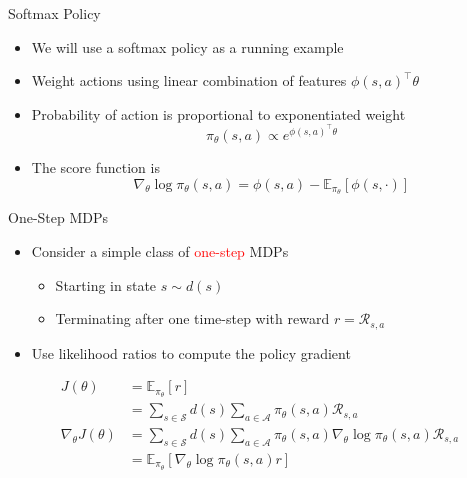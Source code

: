 \begin{frame}{Softmax Policy}
\begin{itemize}
  \item We will use a softmax policy as a running example
  \item Weight actions using linear combination of features $\phi(s, a)^\top \theta$
  \item Probability of action is proportional to exponentiated weight
  \[ \pi_\theta(s, a) \propto e^{\phi(s, a)^\top \theta} \]
  \item The score function is
  \[ \nabla_\theta \log \pi_\theta(s, a) = \phi(s, a) - \mathbb{E}_{\pi_\theta}[\phi(s, \cdot)] \]
\end{itemize}
\end{frame}

\begin{frame}{One-Step MDPs}
\begin{itemize}
  \item Consider a simple class of \textcolor{red}{one-step} MDPs
  \begin{itemize}
    \item Starting in state $s \sim d(s)$
    \item Terminating after one time-step with reward $r = \mathcal{R}_{s,a}$
  \end{itemize}
  \item Use likelihood ratios to compute the policy gradient
\end{itemize}
\begin{align*}
J(\theta) &= \mathbb{E}_{\pi_\theta}[r]\\
&= \sum_{s \in \mathcal{S}} d(s) \sum_{a \in \mathcal{A}} \pi_\theta(s, a) \mathcal{R}_{s,a}\\
\nabla_\theta J(\theta) &= \sum_{s \in \mathcal{S}} d(s) \sum_{a \in \mathcal{A}} \pi_\theta(s, a) \nabla_\theta \log \pi_\theta(s, a) \mathcal{R}_{s,a}\\
&= \mathbb{E}_{\pi_\theta}[\nabla_\theta \log \pi_\theta(s, a) r]
\end{align*}
\end{frame}


